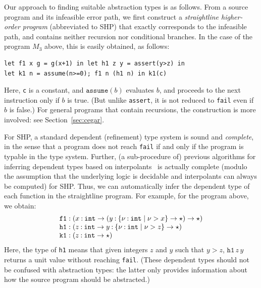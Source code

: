 Our approach to finding suitable abstraction types is as follows.
From a source program and its infeasible error path, we first construct 
a \emph{straightline higher-order program} (abbreviated to SHP) that 
exactly corresponds to the infeasible path, and contains neither 
recursion nor conditional branches. In the case of the program \(M_3\) 
above, this is easily obtained, as follows:
\begin{verbatim}
let f1 x g = g(x+1) in let h1 z y = assert(y>z) in
let k1 n = assume(n>=0); f1 n (h1 n) in k1(c)
\end{verbatim}
Here, \texttt{c} is a constant, and \(\texttt{assume}(b)\) evaluates 
\(b\), and proceeds to the next instruction only if \(b\) is true. (But 
unlike \texttt{assert}, it is not reduced to \texttt{fail} even if \(b\) 
is false.) For general programs that contain recursions, the 
construction is more involved: see Section~\ref{sec:cegar}.

For SHP, a standard dependent (refinement) type system is sound and 
\emph{complete}, in the sense that a program does not reach \texttt{fail} 
if and only if the program is typable in the type system. Further, (a 
sub-procedure of) previous algorithms for inferring dependent types 
based on interpolants~\cite{Unno2009,Terauchi2010} is actually complete 
(modulo the assumption that the underlying logic is decidable and 
interpolants can always be computed) for SHP. Thus, we can automatically 
infer the dependent type of each function in the straightline program. 
For example, for the program above, we obtain:
\[
\begin{array}{l}
\texttt{f1}: (x\mathbin{:}{\texttt{int}}\rightarrow
{(y\mathbin{:}{\{\nu\mathbin{:}\texttt{int}\mid \nu>x\}}\rightarrow{\star})\rightarrow{\star}}) \\
\texttt{h1}: (z\mathbin{:}{\texttt{int}}\rightarrow
        {y\mathbin{:}{\{\nu\mathbin{:}\texttt{int}\mid \nu>z\}}\rightarrow{\star}}) \\
\texttt{k1}: (z\mathbin{:}{\texttt{int}}\rightarrow{\star})
\end{array}
\]
Here, the type of \texttt{h1} means that given integers \(z\) and \(y\) 
such that \(y>z\), \(\texttt{h1}\,z\,y\) returns a unit value without 
reaching \texttt{fail}. (These dependent types should not be confused 
with abstraction types: the latter only provides information about how 
the source program should be abstracted.)

